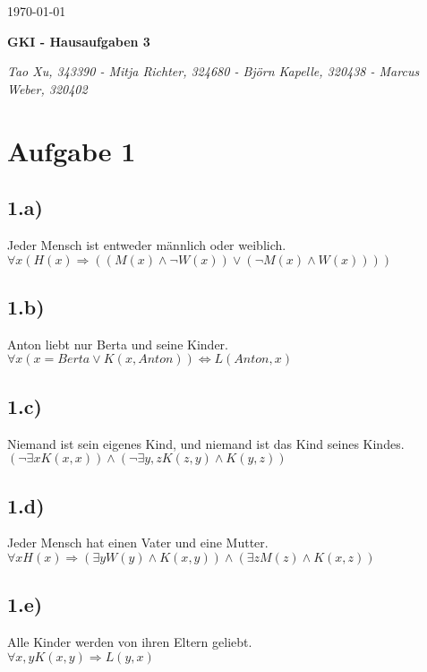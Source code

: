 \documentclass[a4paper]{article}
\begin{document}
  \begin{flushright}
    \today
  \end{flushright}
  \begin{center}
    \Large\textbf{{GKI - Hausaufgaben 3}}\\
  \end{center}

  \begin{center}
        \large\textsl{Tao Xu, 343390 - Mitja Richter, 324680 - Björn Kapelle, 320438 - Marcus Weber, 320402}\\
  \end{center}
\section*{Aufgabe 1}

\subsection*{1.a)}
Jeder Mensch ist entweder m\"annlich oder weiblich. \\
$\forall x ( H(x) \Rightarrow ( (M(x) \land \neg W(x)) \lor (\neg M(x) \land W(x)) ) )$

\subsection*{1.b)}
Anton liebt nur Berta und seine Kinder. \\
$\forall x (x=Berta \lor K(x,Anton)) \Leftrightarrow L(Anton,x)$

\subsection*{1.c)}
Niemand ist sein eigenes Kind, und niemand ist das Kind seines Kindes. \\
$(\neg \exists x K(x,x)) \land (\neg \exists y,z K(z,y) \land K(y,z))$

\subsection*{1.d)}
Jeder Mensch hat einen Vater und eine Mutter. \\
$\forall x H(x) \Rightarrow (\exists y W(y) \land K(x,y)) \land (\exists z M(z) \land K(x,z))$

\subsection*{1.e)}
Alle Kinder werden von ihren Eltern geliebt. \\
$\forall x,y K(x,y) \Rightarrow L(y,x)$
\end{document}
